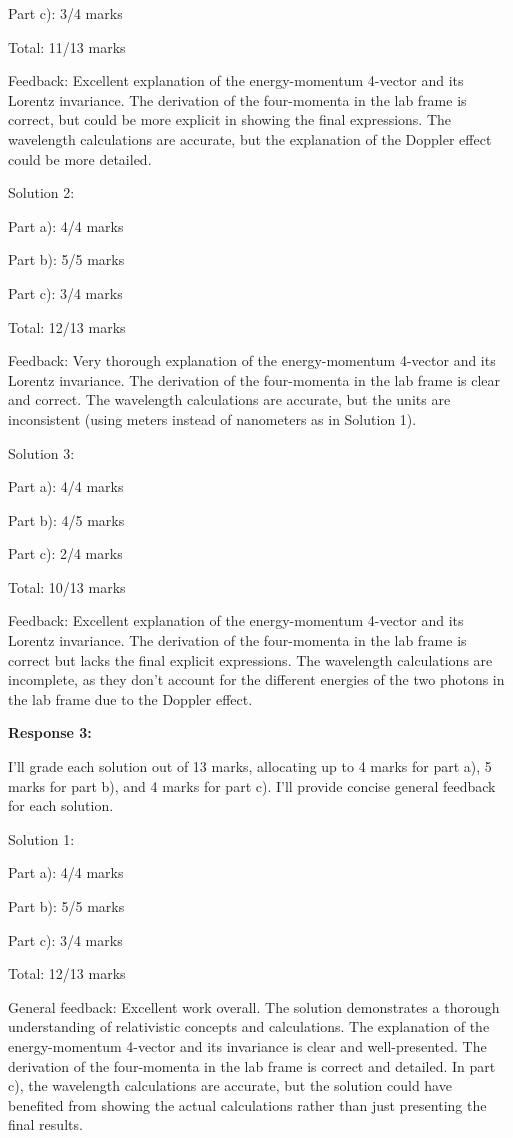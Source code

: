 \documentclass[a4paper,11pt]{article}
\begin{document}
Part c): 3/4 marks

Total: 11/13 marks

Feedback: Excellent explanation of the energy-momentum 4-vector and its Lorentz invariance. The derivation of the four-momenta in the lab frame is correct, but could be more explicit in showing the final expressions. The wavelength calculations are accurate, but the explanation of the Doppler effect could be more detailed.

Solution 2:

Part a): 4/4 marks

Part b): 5/5 marks

Part c): 3/4 marks

Total: 12/13 marks

Feedback: Very thorough explanation of the energy-momentum 4-vector and its Lorentz invariance. The derivation of the four-momenta in the lab frame is clear and correct. The wavelength calculations are accurate, but the units are inconsistent (using meters instead of nanometers as in Solution 1).

Solution 3:

Part a): 4/4 marks

Part b): 4/5 marks

Part c): 2/4 marks

Total: 10/13 marks

Feedback: Excellent explanation of the energy-momentum 4-vector and its Lorentz invariance. The derivation of the four-momenta in the lab frame is correct but lacks the final explicit expressions. The wavelength calculations are incomplete, as they don't account for the different energies of the two photons in the lab frame due to the Doppler effect.

\bigskip
\textbf{Response 3:}

I'll grade each solution out of 13 marks, allocating up to 4 marks for part a), 5 marks for part b), and 4 marks for part c). I'll provide concise general feedback for each solution.

Solution 1:

Part a): 4/4 marks

Part b): 5/5 marks

Part c): 3/4 marks

Total: 12/13 marks

General feedback: Excellent work overall. The solution demonstrates a thorough understanding of relativistic concepts and calculations. The explanation of the energy-momentum 4-vector and its invariance is clear and well-presented. The derivation of the four-momenta in the lab frame is correct and detailed. In part c), the wavelength calculations are accurate, but the solution could have benefited from showing the actual calculations rather than just presenting the final results.
\end{document}
